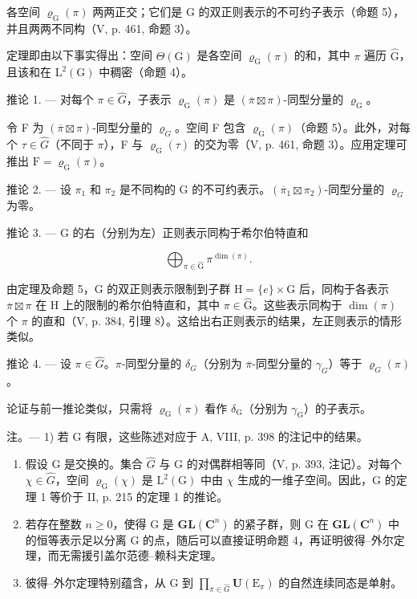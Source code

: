 各空间 \(\varrho_{\mathrm{G}}(\pi)\) 两两正交；它们是 G 的双正则表示的不可约子表示（命题 5），并且两两不同构（V, p. 461, 命题 3）。

定理即由以下事实得出：空间 \(\Theta(\mathrm{G})\) 是各空间 \(\varrho_{\mathrm{G}}(\pi)\) 的和，其中 \(\pi\) 遍历 \(\widehat{\mathrm{G}}\)，且该和在 \(\mathrm{L}^2(\mathrm{G})\) 中稠密（命题 4）。

推论 1. --- 对每个 \(\pi\in\widehat{G}\)，子表示 \(\varrho_{\mathrm{G}}(\pi)\) 是 \((\overline{\pi}\boxtimes\pi)\)-同型分量的 \(\varrho_{\mathrm{G}}\)。

令 F 为 \((\overline{\pi} \boxtimes \pi)\)-同型分量的 \(\varrho_{G}\)。空间 F 包含 \(\varrho_{\mathrm{G}}(\pi)\)（命题 5）。此外，对每个 \(\tau \in \widehat{G}\)（不同于 \(\pi\)），F 与 \(\varrho_{\mathrm{G}}(\tau)\) 的交为零（V, p. 461, 命题 3）。应用定理可推出 \(\mathrm{F} = \varrho_{\mathrm{G}}(\pi)\)。

推论 2. --- 设 \(\pi_1\) 和 \(\pi_2\) 是不同构的 G 的不可约表示。\((\overline{\pi}_1 \boxtimes \pi_2)\)-同型分量的 \(\varrho_G\) 为零。

推论 3. --- G 的右（分别为左）正则表示同构于希尔伯特直和

\[
\bigoplus_ {\pi \in \widehat {\mathrm{G}}} \pi^ {\dim (\pi)}.
\]

由定理及命题 5，G 的双正则表示限制到子群 \(\mathrm{H} = \{e\} \times \mathrm{G}\) 后，同构于各表示 \(\overline{\pi} \boxtimes \pi\) 在 H 上的限制的希尔伯特直和，其中 \(\pi \in \widehat{\mathrm{G}}\)。这些表示同构于 \(\dim(\pi)\) 个 \(\pi\) 的直和（V, p. 384, 引理 8）。这给出右正则表示的结果，左正则表示的情形类似。

推论 4. --- 设 \(\pi\in\widehat{G}\)。\(\pi\)-同型分量的 \(\delta_{G}\)（分别为 \(\overline{\pi}\)-同型分量的 \(\gamma_{G}\)）等于 \(\varrho_{G}(\pi)\)。

论证与前一推论类似，只需将 \(\varrho_{\mathrm{G}}(\pi)\) 看作 \(\delta_{\mathrm{G}}\)（分别为 \(\gamma_{\mathrm{G}}\)）的子表示。

注。--- 1) 若 G 有限，这些陈述对应于 A, VIII, p. 398 的注记中的结果。

\begin{enumerate}
\def\labelenumi{\arabic{enumi})}
\setcounter{enumi}{1}
\item
  假设 G 是交换的。集合 \(\widehat{G}\) 与 G 的对偶群相等同（V, p. 393, 注记）。对每个 \(\chi \in \widehat{G}\)，空间 \(\varrho_{\mathrm{G}}(\chi)\) 是 \(\mathrm{L}^2 (\mathrm{G})\) 中由 \(\chi\) 生成的一维子空间。因此，G 的定理 1 等价于 II, p. 215 的定理 1 的推论。
\item
  若存在整数 \(n \geqslant 0\)，使得 G 是 \(\mathbf{GL}(\mathbf{C}^{n})\) 的紧子群，则 G 在 \(\mathbf{GL}(\mathbf{C}^{n})\) 中的恒等表示足以分离 G 的点，随后可以直接证明命题 4，再证明彼得–外尔定理，而无需援引盖尔范德–赖科夫定理。
\item
  彼得–外尔定理特别蕴含，从 G 到 \(\prod_{\pi\in\widehat{G}}\mathbf{U}(\mathrm{E}_{\pi})\) 的自然连续同态是单射。
\end{enumerate}

